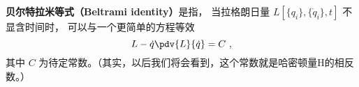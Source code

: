 
\begin{issues}
\issueDraft
\end{issues}


\textbf{贝尔特拉米等式（Beltrami identity）}是指， 当拉格朗日量 $L[\{q_i\}, \{\dot q_i\}, t]$ 不显含时间时， 可以与一个更简单的方程等效
\begin{equation}
L - \dot q \pdv{L}{\dot q} = C~,
\end{equation}
其中 $C$ 为待定常数。（其实，以后我们将会看到，这个常数就是哈密顿量H的相反数。）
